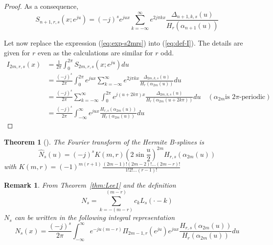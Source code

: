 \documentclass[a4paper, 11pt]{article}
\newtheorem{thm}{Theorem}
\newtheorem{remark}{Remark}
\begin{document}
\begin{proof}
  As a consequence, \begin{equation}\label{eq:exp-s2mrs}
    S_{n+1,r,s}(x;e^{ju}) = {(-j)}^s e^{jux} \sum_{k=-\infty}^{\infty}  e^{2j\pi kx} 
    \frac{\Delta_{n+1,k,s}(u)}{H_r(\alpha_{n+1}(u))}
  \end{equation}
  
  Let now replace the expression (\ref{eq:exp-s2mrs}) into (\ref{eq:def-I}). The details are given for $r$ even as the 
  calculations are similar for $r$ odd.
  \begin{align*}
    I_{2m,r,s}(x) &= \frac{1}{2\pi} \int_0^{2\pi} S_{2m, r, s}(x;e^{ju}) du \\
    &= \frac{{(-j)}^s}{2\pi} \int_0^{2\pi} e^{jux} \sum_{k=-\infty}^{\infty}  e^{2j\pi kx} 
    \frac{\Delta_{2m,k,s}(u)}{H_r(\alpha_{2m}(u))} du \\
    &= \frac{{(-j)}^s}{2\pi} \sum_{k=-\infty}^{\infty} \int_0^{2\pi} e^{j(u+2k\pi) x}  
    \frac{\Delta_{2m,k,s}(u)}{H_r(\alpha_{2m}(u+2k\pi))} du \quad (\alpha_{2m} \text{is $2\pi$-periodic}) \\
    &= \frac{{(-j)}^s}{2\pi} \int_{-\infty}^{\infty} e^{jux} \frac{H_{r, s}(\alpha_{2m}(u))}{H_r(\alpha_{2m}(u))} du
  \end{align*}
\end{proof}

\begin{thm}[{\cite[Theorem 2]{Lee76b}}]\label{thm:Lee2}
  The Fourier transform of the Hermite B-splines is
  \begin{equation}\label{eq:Lee2}
    \hat{N}_s(u) = {(-j)}^s K(m,r) {\left(2 \sin \frac{u}{2} \right)}^{2m} H_{r,s}(\alpha_{2m}(u))
  \end{equation}
  with $K(m,r) = {(-1)}^{m(r+1)} \frac{(2m-1)!(2m-2)!\ldots(2m-r)!}{1!2!\ldots(r-1)!}$
\end{thm}

\begin{remark}
  From Theorem~\ref{thm:Lee1} and the definition
  \begin{equation}
    N_s = \sum_{k=-(m-r)}^{(m-r)} c_k L_s(\cdot-k)
  \end{equation}
  $N_s$ can be written in the following integral representation
  \begin{equation}
    N_s(x) = \frac{{(-j)}^s}{2\pi} \int_{-\infty}^{\infty} e^{-ju(m-r)} \Pi_{2m-1,r}(e^{ju}) e^{jux} \frac{H_{r, 
    s}(\alpha_{2m}(u))}{H_r(\alpha_{2m}(u))} du
  \end{equation}
\end{remark}
\end{document}

